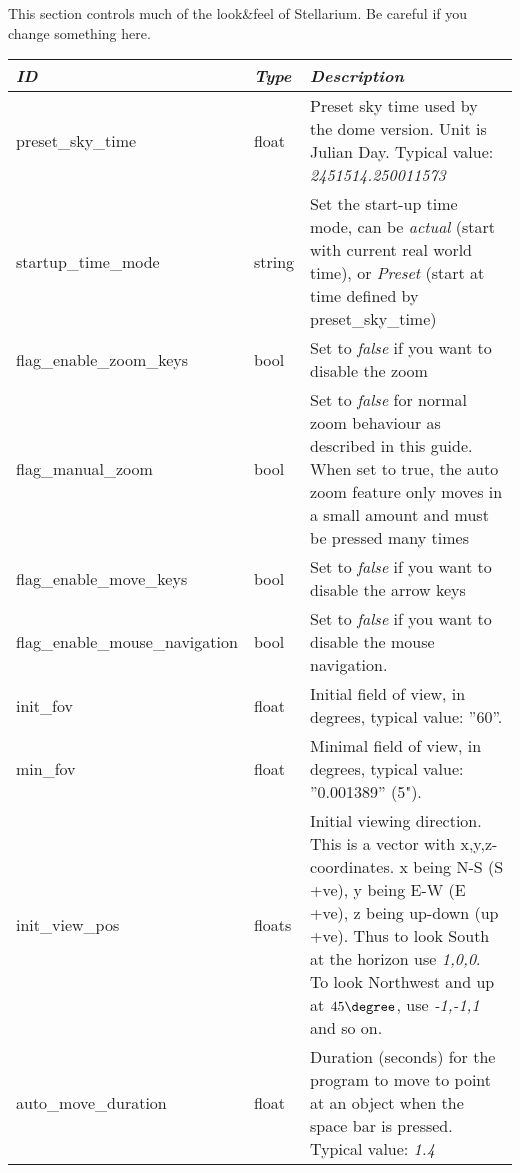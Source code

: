 This section controls much of the look\&feel of Stellarium. Be careful if you change something here.


\begin{longtable}{l|l|p{77mm}}\toprule
\emph{ID}              & \emph{Type} & \emph{Description}\\\midrule
preset\_sky\_time               & float  & Preset sky time used by the dome version. Unit is Julian Day. Typical value: \emph{2451514.250011573}\\%
startup\_time\_mode             & string & Set the start-up time mode, can be \emph{actual} (start with current real world time), 
                                           or \emph{Preset} (start at time defined by preset\_sky\_time)\\%
flag\_enable\_zoom\_keys        & bool   & Set to \emph{false} if you want to disable the zoom\\%
flag\_manual\_zoom              & bool   & Set to \emph{false} for normal zoom behaviour as described in this guide. 
                                           When set to true, the auto zoom feature only moves in a small amount and must be pressed many times\\%
flag\_enable\_move\_keys        & bool   & Set to \emph{false} if you want to disable the arrow keys\\%
flag\_enable\_mouse\_navigation & bool   & Set to \emph{false} if you want to disable the mouse navigation.\\%
init\_fov                       & float  & Initial field of view, in degrees, typical value: ''60''.\\%
min\_fov                        & float  & Minimal field of view, in degrees, typical value: ''0.001389'' (5").\\%
init\_view\_pos                 & floats & Initial viewing direction. This is a vector with x,y,z-coordinates. x being N-S (S +ve), 
                                           y being E-W (E +ve), z being up-down (up +ve). Thus to look South at the horizon use \emph{1,0,0}. 
                                           To look Northwest and up at $45\degree$, use \emph{-1,-1,1} and so on.\\%
auto\_move\_duration            & float  & Duration (seconds) for the program to move to point at an object when the space bar is pressed. 
                                           Typical value: \emph{1.4}\\%

\end{longtable}
